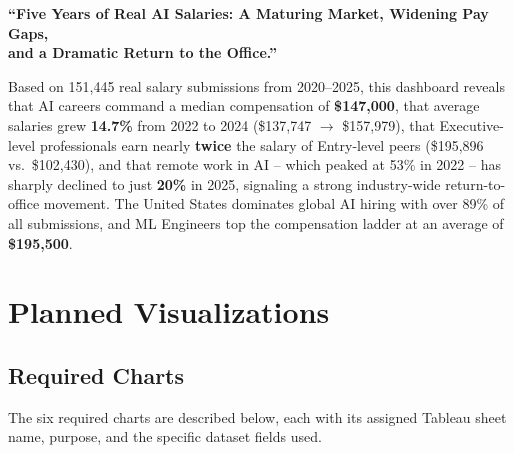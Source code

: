 \documentclass[12pt,a4paper]{article}
\begin{document}
\begin{storybox}
\centering
{\normalsize\bfseries\color{fastblue}
``Five Years of Real AI Salaries: A Maturing Market, Widening Pay Gaps,}\\[4pt]
{\normalsize\bfseries\color{fastblue}
and a Dramatic Return to the Office.''}\\[10pt]
\raggedright\normalsize\color{black}
Based on 151{,}445 real salary submissions from 2020--2025, this dashboard reveals that
AI careers command a median compensation of \textbf{\$147{,}000}, that average salaries
grew \textbf{14.7\%} from 2022 to 2024 (\$137{,}747 $\to$ \$157{,}979), that
Executive-level professionals earn nearly \textbf{twice} the salary of Entry-level peers
(\$195{,}896 vs.\ \$102{,}430), and that remote work in AI -- which peaked at 53\% in
2022 -- has sharply declined to just \textbf{20\%} in 2025, signaling a strong
industry-wide return-to-office movement. The United States dominates global AI hiring
with over 89\% of all submissions, and ML Engineers top the compensation ladder at an
average of \textbf{\$195{,}500}.
\end{storybox}

\section{Planned Visualizations}

\subsection{Required Charts}

The six required charts are described below, each with its assigned Tableau sheet name,
purpose, and the specific dataset fields used.
\end{document}
